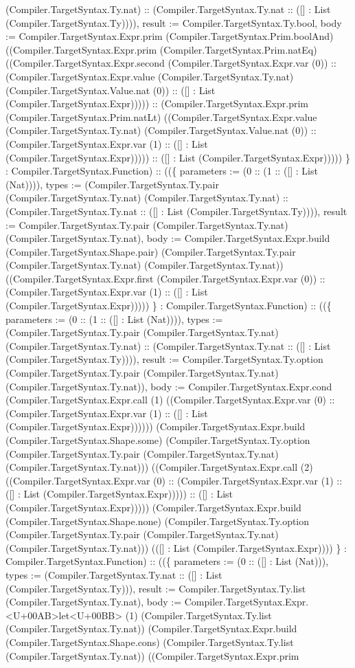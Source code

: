 \documentclass[11pt]{article}
\begin{document}
(Compiler.TargetSyntax.Ty.nat) :: (Compiler.TargetSyntax.Ty.nat :: ([] : List (Compiler.TargetSyntax.Ty)))), result := Compiler.TargetSyntax.Ty.bool, body := Compiler.TargetSyntax.Expr.prim (Compiler.TargetSyntax.Prim.boolAnd) ((Compiler.TargetSyntax.Expr.prim (Compiler.TargetSyntax.Prim.natEq) ((Compiler.TargetSyntax.Expr.second (Compiler.TargetSyntax.Expr.var (0)) :: (Compiler.TargetSyntax.Expr.value (Compiler.TargetSyntax.Ty.nat) (Compiler.TargetSyntax.Value.nat (0)) :: ([] : List (Compiler.TargetSyntax.Expr))))) :: (Compiler.TargetSyntax.Expr.prim (Compiler.TargetSyntax.Prim.natLt) ((Compiler.TargetSyntax.Expr.value (Compiler.TargetSyntax.Ty.nat) (Compiler.TargetSyntax.Value.nat (0)) :: (Compiler.TargetSyntax.Expr.var (1) :: ([] : List (Compiler.TargetSyntax.Expr))))) :: ([] : List (Compiler.TargetSyntax.Expr))))) \} : Compiler.TargetSyntax.Function) :: ((\{ parameters := (0 :: (1 :: ([] : List (Nat)))), types := (Compiler.TargetSyntax.Ty.pair (Compiler.TargetSyntax.Ty.nat) (Compiler.TargetSyntax.Ty.nat) :: (Compiler.TargetSyntax.Ty.nat :: ([] : List (Compiler.TargetSyntax.Ty)))), result := Compiler.TargetSyntax.Ty.pair (Compiler.TargetSyntax.Ty.nat) (Compiler.TargetSyntax.Ty.nat), body := Compiler.TargetSyntax.Expr.build (Compiler.TargetSyntax.Shape.pair) (Compiler.TargetSyntax.Ty.pair (Compiler.TargetSyntax.Ty.nat) (Compiler.TargetSyntax.Ty.nat)) ((Compiler.TargetSyntax.Expr.first (Compiler.TargetSyntax.Expr.var (0)) :: (Compiler.TargetSyntax.Expr.var (1) :: ([] : List (Compiler.TargetSyntax.Expr))))) \} : Compiler.TargetSyntax.Function) :: ((\{ parameters := (0 :: (1 :: ([] : List (Nat)))), types := (Compiler.TargetSyntax.Ty.pair (Compiler.TargetSyntax.Ty.nat) (Compiler.TargetSyntax.Ty.nat) :: (Compiler.TargetSyntax.Ty.nat :: ([] : List (Compiler.TargetSyntax.Ty)))), result := Compiler.TargetSyntax.Ty.option (Compiler.TargetSyntax.Ty.pair (Compiler.TargetSyntax.Ty.nat) (Compiler.TargetSyntax.Ty.nat)), body := Compiler.TargetSyntax.Expr.cond (Compiler.TargetSyntax.Expr.call (1) ((Compiler.TargetSyntax.Expr.var (0) :: (Compiler.TargetSyntax.Expr.var (1) :: ([] : List (Compiler.TargetSyntax.Expr)))))) (Compiler.TargetSyntax.Expr.build (Compiler.TargetSyntax.Shape.some) (Compiler.TargetSyntax.Ty.option (Compiler.TargetSyntax.Ty.pair (Compiler.TargetSyntax.Ty.nat) (Compiler.TargetSyntax.Ty.nat))) ((Compiler.TargetSyntax.Expr.call (2) ((Compiler.TargetSyntax.Expr.var (0) :: (Compiler.TargetSyntax.Expr.var (1) :: ([] : List (Compiler.TargetSyntax.Expr))))) :: ([] : List (Compiler.TargetSyntax.Expr))))) (Compiler.TargetSyntax.Expr.build (Compiler.TargetSyntax.Shape.none) (Compiler.TargetSyntax.Ty.option (Compiler.TargetSyntax.Ty.pair (Compiler.TargetSyntax.Ty.nat) (Compiler.TargetSyntax.Ty.nat))) (([] : List (Compiler.TargetSyntax.Expr)))) \} : Compiler.TargetSyntax.Function) :: ((\{ parameters := (0 :: ([] : List (Nat))), types := (Compiler.TargetSyntax.Ty.nat :: ([] : List (Compiler.TargetSyntax.Ty))), result := Compiler.TargetSyntax.Ty.list (Compiler.TargetSyntax.Ty.nat), body := Compiler.TargetSyntax.Expr.<U+00AB>let<U+00BB> (1) (Compiler.TargetSyntax.Ty.list (Compiler.TargetSyntax.Ty.nat)) (Compiler.TargetSyntax.Expr.build (Compiler.TargetSyntax.Shape.cons) (Compiler.TargetSyntax.Ty.list (Compiler.TargetSyntax.Ty.nat)) ((Compiler.TargetSyntax.Expr.prim 
\end{document}
